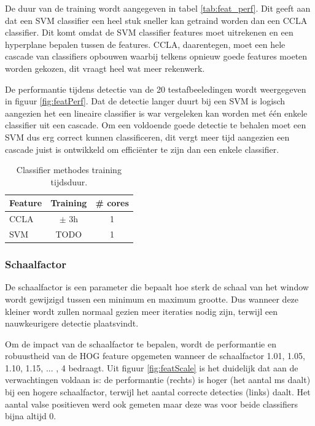 De duur van de training wordt aangegeven in tabel \ref{tab:feat_perf}. Dit geeft aan dat een SVM classifier een heel stuk sneller kan getraind worden dan een CCLA classifier. Dit komt omdat de SVM classifier features moet uitrekenen en een hyperplane bepalen tussen de features. CCLA, daarentegen, moet een hele cascade van classifiers opbouwen waarbij telkens opnieuw goede features moeten worden gekozen, dit vraagt heel wat meer rekenwerk.

De performantie tijdens detectie van de 20 testafbeeledingen wordt weergegeven in figuur \ref{fig:featPerf}. Dat de detectie langer duurt bij een SVM is logisch aangezien het een lineaire classifier is war vergeleken kan worden met \'e\'en enkele classifier uit een cascade. Om een voldoende goede detectie te behalen moet een SVM dus erg correct kunnen classificeren, dit vergt meer tijd aangezien een cascade juist is ontwikkeld om effici\"enter te zijn dan een enkele classifier.

\begin{table}
  \centering
  \begin{tabular}{@{}lcc@{}} \toprule
    Feature & Training & \# cores \\ \midrule
    CCLA & $\pm$ 3h & 1\\
    SVM & TODO & 1\\ \bottomrule
  \end{tabular}
  \caption{Classifier methodes training tijdsduur.}
  \label{tab:class_perf}
\end{table}

\subsubsection*{Schaalfactor}
De schaalfactor is een parameter die bepaalt hoe sterk de schaal van het window wordt gewijzigd tussen een minimum en maximum grootte. Dus wanneer deze kleiner wordt zullen normaal gezien meer iteraties nodig zijn, terwijl een nauwkeurigere detectie plaatsvindt.

Om de impact van de schaalfactor te bepalen, wordt de performantie en robuustheid van de HOG feature opgemeten wanneer de schaalfactor 1.01, 1.05, 1.10, 1.15, ... , 4 bedraagt. Uit figuur \ref{fig:featScale} is het duidelijk dat aan de verwachtingen voldaan is: de performantie (rechts) is hoger (het aantal ms daalt) bij een hogere schaalfactor, terwijl het aantal correcte detecties (links) daalt. Het aantal valse positieven werd ook gemeten maar deze was voor beide classifiers bijna altijd 0. 


